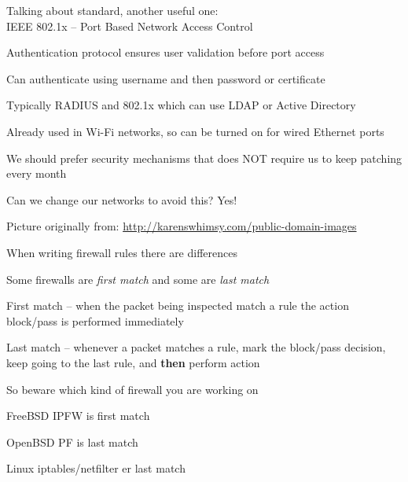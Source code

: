 \documentclass[Screen16to9,17pt]{foils}
\begin{document}

Talking about standard, another useful one:\\
IEEE 802.1x -- Port Based Network Access Control


\begin{list1}
\item Authentication protocol ensures user validation before port access
\item Can authenticate using username and then password or certificate
\item Typically RADIUS and 802.1x which can use LDAP or Active Directory
\item Already used in Wi-Fi networks, so can be turned on for wired Ethernet ports
\end{list1}






\begin{list2}
\item We should prefer security mechanisms that does NOT require us to keep patching every month
\item Can we change our networks to avoid this? Yes!
\end{list2}



\centerline{Picture originally from: \url{http://karenswhimsy.com/public-domain-images}}




\begin{list1}
\item When writing firewall rules there are differences
\item Some firewalls are \emph{first match} and some are \emph{last match}
\begin{list2}
\item First match -- when the packet being inspected match a rule the action block/pass is performed immediately
\item  Last match  -- whenever a packet matches a rule, mark the block/pass decision, keep going to the last rule, and {\bf then} perform action
\end{list2}
\item So beware which kind of firewall you are working on
\item FreeBSD IPFW is first match
\item OpenBSD PF is last match
\item Linux iptables/netfilter er last match
\end{list1}
\end{document}

